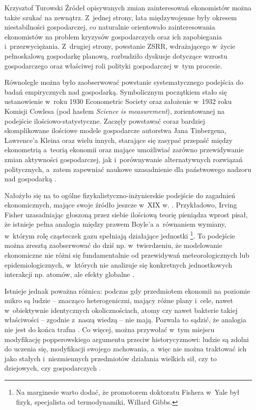 \begin{artplenv}{Krzysztof Turowski}
Źródeł opisywanych zmian zainteresowań ekonomistów można także szukać na zewnątrz. Z~jednej strony, lata międzywojenne
były okresem niestabilności gospodarczej, co naturalnie orientowało zainteresowania ekonomistów na problem kryzysów
gospodarczych oraz ich zapobiegania i~przezwyciężania. Z~drugiej strony, powstanie ZSRR, wdrażającego w~życie
pełnoskalową gospodarkę planową, rozbudziło dyskusje dotyczące wzrostu gospodarczego oraz właściwej roli polityki
gospodarczej w~tym procesie.

Równolegle można było zaobserwować powstanie systematycznego podejścia do badań empirycznych nad gospodarką.
Symbolicznym początkiem stało się ustanowienie w~roku 1930 Econometric Society oraz założenie w~1932 roku Komisji
Cowlesa (pod hasłem \textit{Science is measurement}), zorientowanej na podejście ilościowo-statystyczne. Zaczęły
powstawać coraz bardziej skomplikowane ilościowe modele gospodarcze autorstwa Jana Tinbergena, Lawrence’a Kleina oraz
wielu innych, starające się zasypać przepaść między ekonometrią a~teorią ekonomii oraz mające umożliwiać zarówno
przewidywanie zmian aktywności gospodarczej, jak i~porównywanie alternatywnych rozwiązań politycznych, a~zatem
zapewniać naukowe uzasadnienie dla państwowego nadzoru nad gospodarką
\parencite{de_vroey_keynesian_2012}.

Nałożyło się na to ogólne fizykalistyczno-inżynierskie podejście do zagadnień ekonomicznych, mające swoje źródło jeszcze
w~XIX w.
\parencite{mirowski_more_1999}.
Przykładowo, Irving Fisher uzasadniając głoszoną przez siebie
ilościową teorię pieniądza wprost pisał, że istnieje pełna analogia między prawem Boyle’a a~równaniem wymiany, w~którym
rolę cząsteczek gazu spełniają działające jednostki
\parencite{fisher_purchasing_1922}\footnote{Na marginesie warto dodać, że promotorem
doktoratu Fishera w~Yale był fizyk, specjalista od termodynamiki, Willard Gibbs.}. To podejście można zresztą
zaobserwować do dziś np. w~twierdzeniu, że modelowanie ekonomiczne nie różni się fundamentalnie od przewidywań
meteorologicznych lub epidemiologicznych, w~których nie analizuje się konkretnych jednostkowych interakcji
np. atomów, ale efekty globalne
\parencite{buchanan_forecast:_2013}.

Istnieje jednak poważna różnica: podczas gdy przedmiotem ekonomii na poziomie mikro są ludzie -- znacząco
heterogeniczni, mający różne plany i~cele, nawet w~obiektywnie identycznych okolicznościach, atomy czy nawet
bakterie takiej właściwości -- zgodnie z~naszą wiedzą -- nie mają. Pozwala to sądzić, że analogia nie jest
do końca trafna
\parencite{penrose_biological_1952}.
Co więcej, można przywołać w~tym miejscu
modyfikację popperowskiego argumentu przeciw historycyzmowi: ludzie są zdolni do uczenia się, modyfikacji swojego
zachowania, a~więc nie można traktować ich jako stałych i~niezmiennych przedmiotów działania wielkich sił, czy to
dziejowych, czy gospodarczych
\parencite{popper_poverty_1957,hoppe_economic_1995}.


\end{artplenv}
